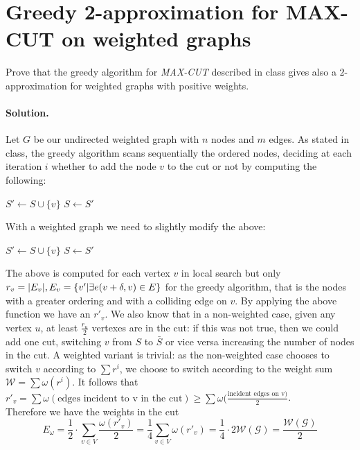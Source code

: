 \section{Greedy  2-approximation for  MAX-CUT  on  weighted  graphs}
Prove  that  the  greedy algorithm for \emph{MAX-CUT} described in class gives also a $2$-approximation for weighted graphs with positive weights.

\paragraph{Solution.}
Let $G$ be our undirected weighted graph with $n$ nodes and $m$ edges.
As stated in class, the greedy algorithm scans sequentially the ordered nodes, deciding at each iteration $i$ whether to add the node $v$ to the cut or not by computing the following:
	\begin{algorithmic}[1]
	\State $S' \gets S \cup \{v\}$\;
		\State $S \gets S'$\;
	\EndIf
	\EndFunction
	\end{algorithmic}
With a weighted graph we need to slightly modify the above:
	\begin{algorithmic}[1]
	\State $S' \gets S \cup \{v\}$\;
	\State $S \gets S'$\;
	\EndIf
	\EndFunction
\end{algorithmic}
The above is computed for each vertex $v$ in local search but only $r_v = \lvert E_v\rvert, E_v = \{v' | \exists e(v + \delta, v) \in E\}$ for the greedy algorithm, that is the nodes with a greater ordering and with a colliding edge on $v$.
By applying the above function we have an $r'_v$.
We also know that in a non-weighted case, given any vertex $u$, at least $\frac{r_u}{2}$ vertexes are in the cut: if this was not true, then we could add one cut, switching $v$ from $S$ to $\bar{S}$ or vice versa increasing the number of nodes in the cut.
A weighted variant is trivial: as the non-weighted case chooses to switch $v$ according to $\sum{r^i}$, we choose to switch according to the weight sum $\mathcal{W} = \sum{\omega(r^i)}$.
It follows that $r'_v = \sum{\omega(\text{edges incident to v in the cut})} \geq \sum{\omega(\frac{\text{incident edges on v})}{2}}$. \\
Therefore we have the weights in the cut
\begin{equation}
E_{\omega} = \frac{1}{2} \cdot \sum_{v \in V}{\frac{\omega(r'_v)}{2}} =
\frac{1}{4} \sum_{v \in V}{\omega(r'_v)} =
\frac{1}{4} \cdot 2\mathcal{W(G)} = \frac{\mathcal{W(G)}}{2}
\end{equation}